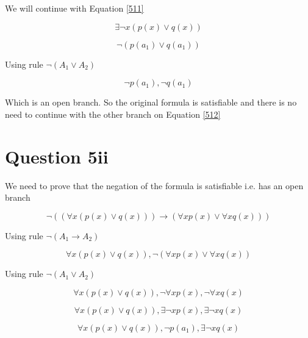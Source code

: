 \documentclass[10pt,a4paper]{article}
\begin{document}
We will continue with Equation \ref{511}

\begin{equation}
 \exists \neg x (p(x)\vee q(x))
\end{equation}

\begin{equation}
 \neg(p(a_1)\vee q(a_1))
\end{equation}

Using rule $\neg(A_1\vee A_2)$

\begin{equation}
 \neg p(a_1),\neg q(a_1)
\end{equation}

Which is an open branch. So the original formula is satisfiable and there is no need to continue with the other branch on Equation \ref{512} 










 \section{Question 5ii}
 
 We need to prove that the negation of the formula is satisfiable i.e. has an open branch
 
 
\begin{equation}
 \neg ((\forall x(p(x) \vee q(x)))\rightarrow (\forall x p(x) \vee \forall xq(x)))
\end{equation}

Using rule $\neg(A_1 \rightarrow A_2)$

\begin{equation}
 \forall x (p(x) \vee q(x)),\neg(\forall x p(x) \vee \forall x q(x))
\end{equation}

 Using rule $\neg(A_1 \vee A_2)$

 \begin{equation}
 \forall x (p(x) \vee q(x)), \neg \forall x p(x), \neg \forall x q(x)
\end{equation}

 \begin{equation}
 \forall x (p(x) \vee q(x)), \exists\neg x p(x), \exists \neg x q(x)
\end{equation}

 \begin{equation}
 \forall x (p(x) \vee q(x)),\neg p(a_1), \exists \neg x q(x)
\end{equation}
\end{document}
